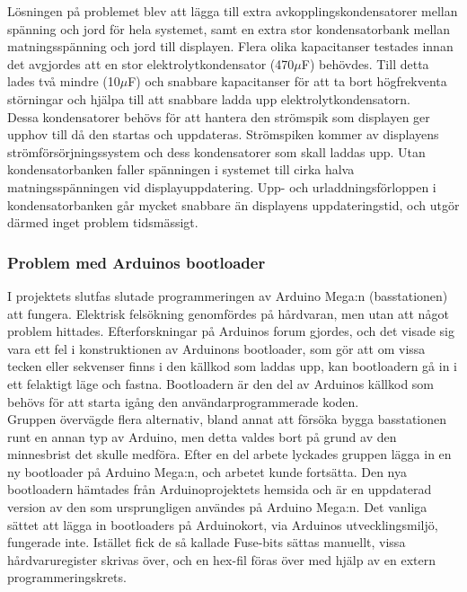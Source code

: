 \documentclass[a4paper,11pt]{article}
\begin{document}
Lösningen på problemet blev att lägga till extra avkopplingskondensatorer mellan spänning och jord för hela systemet, samt en extra stor kondensatorbank mellan matningsspänning och jord till displayen. Flera olika kapacitanser testades innan det avgjordes att en stor elektrolytkondensator (470$\mu$F) behövdes. Till detta lades två mindre (10$\mu$F) och snabbare kapacitanser för att ta bort högfrekventa störningar och hjälpa till att snabbare ladda upp elektrolytkondensatorn. \\

Dessa kondensatorer behövs för att hantera den strömspik som displayen ger upphov till då den startas och uppdateras. Strömspiken kommer av displayens strömförsörjningssystem och dess kondensatorer som skall laddas upp. Utan kondensatorbanken faller spänningen i systemet till cirka halva matningsspänningen vid displayuppdatering. Upp- och urladdningsförloppen i kondensatorbanken går mycket snabbare än displayens uppdateringstid, och utgör därmed inget problem tidsmässigt.

\subsubsection{Problem med Arduinos bootloader}
I projektets slutfas slutade programmeringen av Arduino Mega:n (basstationen) att fungera. Elektrisk felsökning genomfördes på hårdvaran, men utan att något problem hittades. Efterforskningar på Arduinos forum gjordes, och det visade sig vara ett fel i konstruktionen av Arduinons bootloader, som gör att om vissa tecken eller sekvenser finns i den källkod som laddas upp, kan bootloadern gå in i ett felaktigt läge och fastna. Bootloadern är den del av Arduinos källkod som behövs för att starta igång den användarprogrammerade koden. \\

Gruppen övervägde flera alternativ, bland annat att försöka bygga basstationen runt en annan typ av Arduino, men detta valdes bort på grund av den minnesbrist det skulle medföra. Efter en del arbete lyckades gruppen lägga in en ny bootloader på Arduino Mega:n, och arbetet kunde fortsätta. Den nya bootloadern hämtades från Arduinoprojektets hemsida och är en uppdaterad version av den som ursprungligen användes på Arduino Mega:n. Det vanliga sättet att lägga in bootloaders på Arduinokort, via Arduinos utvecklingsmiljö, fungerade inte. Istället fick de så kallade Fuse-bits sättas manuellt, vissa hårdvaruregister skrivas över, och en hex-fil föras över med hjälp av en extern programmeringskrets.
\end{document}
